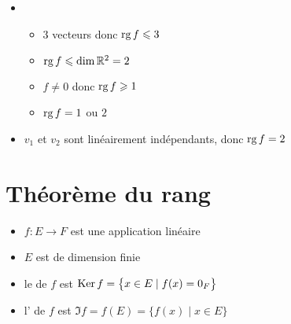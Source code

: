 \begin{frame}
\begin{exemple}
\begin{itemize}
\pause
  \item 
  \begin{itemize}
    \item $3$ vecteurs donc $\mathop{\text{rg}}\nolimits f \leqslant 3$
\pause  
     \item  $\mathop{\text{rg}}\nolimits f \leqslant \dim \mathbb{R}^2 = 2$
\pause  
     \item $f \neq 0$ donc $\mathop{\text{rg}}\nolimits f \geqslant 1$
\pause  
     \item $\mathop{\text{rg}}\nolimits f = 1$ ou $2$
   \end{itemize}
   
\pause 
  \item $v_1$ et $v_2$ sont linéairement indépendants, donc $\mathop{\text{rg}}\nolimits f = 2$
\end{itemize}  

\end{exemple}

\end{frame}


\section{Théorème du rang}

\begin{frame}

\begin{itemize}
  \item $f : E \to F$ est une application linéaire
\pause  
  \item $E$ est de dimension finie
\pause  
  \item le  de $f$ est $\mathop{\text{Ker}}\nolimits f=\big\{x \in E \mid f(x)=0_{F}\big\}$
 \pause 
  \item l' de $f$ est $\Im f = f(E) = \big\{ f(x) \mid x \in E \big\}$
\end{itemize}

\pause

\begin{theoreme}[du rang]
\end{theoreme}

\pause



\end{frame}

